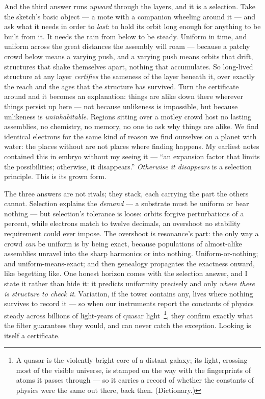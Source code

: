 \documentclass[fontsize=11pt,paper=a4,pagesize=auto,parskip=half-]{scrbook}
\begin{document}
And the third answer runs \emph{upward} through the layers, and it is a selection. Take the sketch's basic object --- a mote with a companion wheeling around it --- and ask what it needs in order to \emph{last}: to hold its orbit long enough for anything to be built from it. It needs the rain from below to be steady. Uniform in time, and uniform across the great distances the assembly will roam --- because a patchy crowd below means a varying push, and a varying push means orbits that drift, structures that shake themselves apart, nothing that accumulates. So long-lived structure at any layer \emph{certifies} the sameness of the layer beneath it, over exactly the reach and the ages that the structure has survived. Turn the certificate around and it becomes an explanation: things are alike down there wherever things persist up here --- not because unlikeness is impossible, but because unlikeness is \emph{uninhabitable}. Regions sitting over a motley crowd host no lasting assemblies, no chemistry, no memory, no one to ask why things are alike. We find identical electrons for the same kind of reason we find ourselves on a planet with water: the places without are not places where finding happens. My earliest notes contained this in embryo without my seeing it --- ``an expansion factor that limits the possibilities; otherwise, it disappears.'' \emph{Otherwise it disappears} is a selection principle. This is its grown form.

The three answers are not rivals; they stack, each carrying the part the others cannot. Selection explains the \emph{demand} --- a substrate must be uniform or bear nothing --- but selection's tolerance is loose: orbits forgive perturbations of a percent, while electrons match to twelve decimals, an overshoot no stability requirement could ever impose. The overshoot is resonance's part: the only way a crowd \emph{can} be uniform is by being exact, because populations of almost-alike assemblies unravel into the sharp harmonics or into nothing. Uniform-or-nothing; and uniform-means-exact; and then genealogy propagates the exactness onward, like begetting like. One honest horizon comes with the selection answer, and I state it rather than hide it: it predicts uniformity precisely and only \emph{where there is structure to check it}. Variation, if the tower contains any, lives where nothing survives to record it --- so when our instruments report the constants of physics steady across billions of light-years of quasar light~\cite{uzan2003,damourdyson1996}\footnote{A quasar is the violently bright core of a distant galaxy; its light, crossing most of the visible universe, is stamped on the way with the fingerprints of atoms it passes through --- so it carries a record of whether the constants of physics were the same out there, back then. (Dictionary.)}, they confirm exactly what the filter guarantees they would, and can never catch the exception. Looking is itself a certificate.
\end{document}
